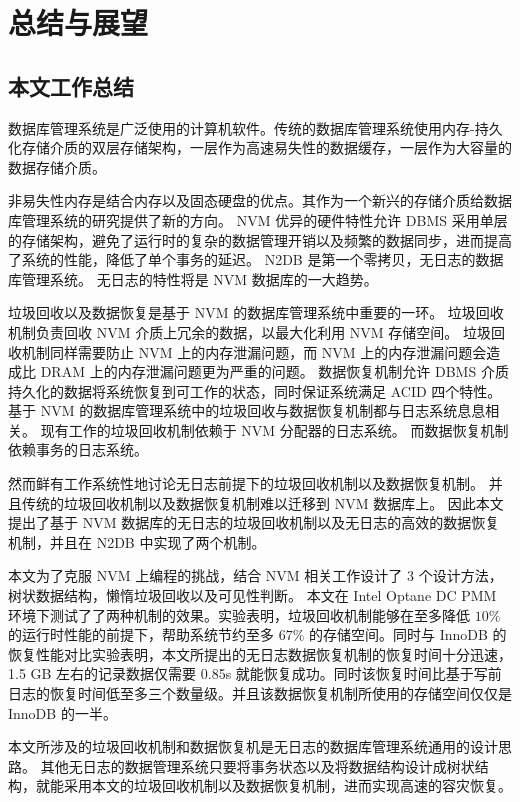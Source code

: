
\chapter{总结与展望}

\section{本文工作总结}


数据库管理系统是广泛使用的计算机软件。传统的数据库管理系统使用内存-持久化存储介质的双层存储架构，一层作为高速易失性的数据缓存，一层作为大容量的数据存储介质。

非易失性内存是结合内存以及固态硬盘的优点。其作为一个新兴的存储介质给数据库管理系统的研究提供了新的方向。
NVM 优异的硬件特性允许 DBMS 采用单层的存储架构，避免了运行时的复杂的数据管理开销以及频繁的数据同步，进而提高了系统的性能，降低了单个事务的延迟。
N2DB 是第一个零拷贝，无日志的数据库管理系统。
无日志的特性将是 NVM 数据库的一大趋势。

垃圾回收以及数据恢复是基于 NVM 的数据库管理系统中重要的一环。
垃圾回收机制负责回收 NVM 介质上冗余的数据，以最大化利用 NVM 存储空间。
垃圾回收机制同样需要防止 NVM 上的内存泄漏问题，而 NVM 上的内存泄漏问题会造成比 DRAM 上的内存泄漏问题更为严重的问题。
数据恢复机制允许 DBMS 介质持久化的数据将系统恢复到可工作的状态，同时保证系统满足 ACID 四个特性。
基于 NVM 的数据库管理系统中的垃圾回收与数据恢复机制都与日志系统息息相关。
现有工作的垃圾回收机制依赖于 NVM 分配器的日志系统。
而数据恢复机制依赖事务的日志系统。

然而鲜有工作系统性地讨论无日志前提下的垃圾回收机制以及数据恢复机制。
并且传统的垃圾回收机制以及数据恢复机制难以迁移到 NVM 数据库上。
因此本文提出了基于 NVM 数据库的无日志的垃圾回收机制以及无日志的高效的数据恢复机制，并且在 N2DB 中实现了两个机制。

本文为了克服 NVM 上编程的挑战，结合 NVM 相关工作设计了 3 个设计方法，树状数据结构，懒惰垃圾回收以及可见性判断。
本文在 Intel Optane DC PMM 环境下测试了了两种机制的效果。实验表明，垃圾回收机制能够在至多降低 $10\%$ 的运行时性能的前提下，帮助系统节约至多 $67\%$ 的存储空间。同时与 InnoDB 的恢复性能对比实验表明，本文所提出的无日志数据恢复机制的恢复时间十分迅速，1.5 GB 左右的记录数据仅需要 0.85s 就能恢复成功。同时该恢复时间比基于写前日志的恢复时间低至多三个数量级。并且该数据恢复机制所使用的存储空间仅仅是 InnoDB 的一半。

本文所涉及的垃圾回收机制和数据恢复机是无日志的数据库管理系统通用的设计思路。
其他无日志的数据管理系统只要将事务状态以及将数据结构设计成树状结构，就能采用本文的垃圾回收机制以及数据恢复机制，进而实现高速的容灾恢复。


